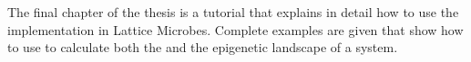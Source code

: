 The final chapter of the thesis is a tutorial that explains in detail how to use the  implementation in Lattice Microbes. Complete examples are given that show how to use  to calculate both the  and the epigenetic landscape of a system.







